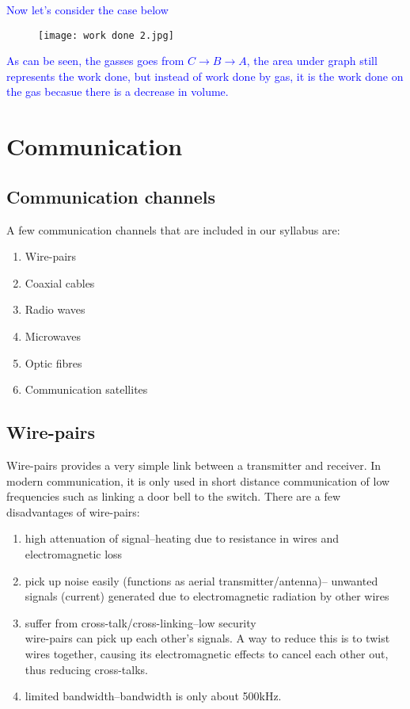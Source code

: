 \documentclass{article}
\begin{document}
\textcolor{blue}{Now let's consider the case below}
\begin{figure}[H]
    \centering
    \texttt{[image: work done 2.jpg]}
\end{figure}
\textcolor{blue}{As can be seen, the gasses goes from $C\to B \to A$, the area under graph still represents the work done, but instead of work done by gas, it is the work done on the gas becasue there is a decrease in volume.}

\newpage
\section{Communication}

\subsection{Communication channels}
 
 A few communication channels that are included in our syllabus are:
 \begin{enumerate}
     \item Wire-pairs
     \item Coaxial cables
     \item Radio waves
     \item Microwaves
     \item Optic fibres
     \item Communication satellites
 \end{enumerate}
 
 
 \subsection{Wire-pairs}

 Wire-pairs provides a very simple link between a transmitter and receiver. In modern communication, it is only used in short distance communication of low frequencies such as linking a door bell to the switch. There are a few disadvantages of wire-pairs:
 \begin{enumerate}
     \item high attenuation of signal--heating due to resistance in wires and electromagnetic loss
     \item pick up noise easily (functions as aerial transmitter/antenna)-- unwanted signals (current) generated due to electromagnetic radiation by other wires
     \item suffer from cross-talk/cross-linking--low security
     \\wire-pairs can pick up each other's signals. A way to reduce this is to twist wires together, causing its electromagnetic effects to cancel each other out, thus reducing cross-talks.
     \item limited bandwidth--bandwidth is only about 500kHz.
 \end{enumerate}
 
\end{document}
